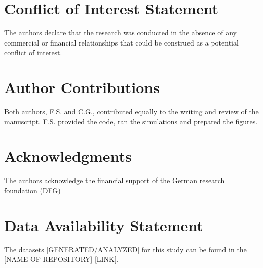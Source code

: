 \documentclass[utf8]{frontiersSCNS} %
\begin{document}
\section*{Conflict of Interest Statement}

The authors declare that the research was conducted in the absence of any commercial or financial relationships that could be construed as a potential conflict of interest.

\section*{Author Contributions}

Both authors, F.S. and C.G., contributed equally to the
writing and review of the manuscript. F.S. provided the code,
ran the simulations and prepared the figures.


\section*{Acknowledgments}

The authors acknowledge the financial support of
the German research foundation (DFG)

\section*{Data Availability Statement}
The datasets [GENERATED/ANALYZED] for this study can be found in the [NAME OF REPOSITORY] [LINK].
\end{document}
